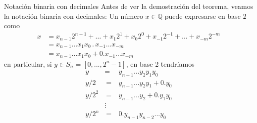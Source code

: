 \documentclass[a4paper,11pt]{book} %
\numberwithin{equation}{chapter}
\begin{document}
	 \begin{mybox_blue}{Notación binaria con decimales}
	 Antes de ver la demostración del teorema, veamos la notación binaria con decimales: Un número $x \in \mathbb{Q}$ puede expresarse en base 2 como
	 \begin{align*}
	 x & = x_{n-1} 2^{n-1} + \dots + x_1 2^1 + x_0 2^0 + x_{-1} 2^{-1} + \dots + x_{-m} 2^{-m} \\
	   & = x_{n-1} \dots x_1 x_0 \, . \, x_{-1} \dots x_{-m} \\
	   & = x_{n-1} \dots x_1 x_0 + 0.x_{-1} \dots x_{-m}
	 \end{align*}
	 en particular, si $y\in S_n =[0,...,2^n-1]$, en base 2 tendríamos
	\begin{eqnarray}
	y &=& y_{n-1} \ldots   y_2y_1 y_0 \nonumber\\  
	y/2&~=~&  y_{n-1}...y_2y_1 + 0. y_0 \nonumber\\ 
	y/2^2 &~=~&  y_{n-1}...y_2 + 0.y_1 y_0 \nonumber\\ 
	&\vdots & \nonumber \\ 
	y/2^n &~=~&   0.y_{n-1}y_{n-2}...y_0 \, 
	\end{eqnarray}
	 \end{mybox_blue}
	
	
	
\end{document}
